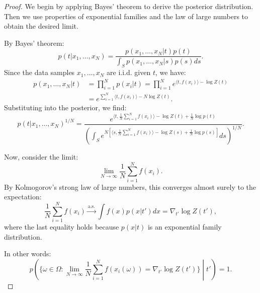 \documentclass[10pt,a4paper]{amsart}
\begin{document}
\begin{proof}
We begin by applying Bayes' theorem to derive the posterior distribution. Then we use properties of exponential families and the law of large numbers to obtain the desired limit.

By Bayes' theorem:
\begin{equation}
p(t|x_1, \ldots, x_N) = \frac{p(x_1, \ldots, x_N|t)p(t)}{\int_S p(x_1, \ldots, x_N|s)p(s)ds}.
\end{equation}
Since the data samples $x_1, \ldots, x_N$ are i.i.d. given $t$, we have:
\begin{equation}
\begin{split}
p(x_1, \ldots, x_N|t) &= \prod_{i=1}^N p(x_i|t) = \prod_{i=1}^N e^{\langle t, f(x_i) \rangle - \log Z(t)} \\ &= e^{\sum_{i=1}^N \langle t, f(x_i) \rangle - N \log Z(t)}.
\end{split}
\end{equation}
Substituting into the posterior, we find:
\begin{equation}
p(t|x_1, \ldots, x_N)^{1/N} = \frac{e^{\langle t, \frac{1}{N} \sum_{i=1}^N f(x_i) \rangle - \log Z(t) + \frac{1}{N} \log p(t)}}{\left(\int_S e^{N\left[\langle s, \frac{1}{N} \sum_{i=1}^N f(x_i) \rangle - \log Z(s) + \frac{1}{N}\log p(s) \right]} ds \right)^{1/N}}.
\end{equation}

Now, consider the limit:
\begin{equation}
\lim_{N \to \infty} \frac{1}{N} \sum_{i=1}^N f(x_i).
\end{equation}
By Kolmogorov's strong law of large numbers, this converges almost surely to the expectation:
\begin{equation}
\frac{1}{N} \sum_{i=1}^N f(x_i) \xrightarrow{\text{a.s.}} \int f(x) p(x|t') dx = \nabla_{t'} \log Z(t'),
\end{equation}
where the last equality holds because $p(x|t)$ is an exponential family distribution.

In other words:
\begin{equation}
p\left(\{\omega \in \Omega : \lim_{N \to \infty} \frac{1}{N} \sum_{i=1}^N f(x_i(\omega)) = \nabla_{t'} \log Z(t')\} \middle| t' \right) = 1.
\end{equation}


\end{proof}
\end{document}
